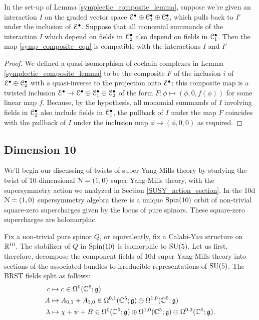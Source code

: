 \documentclass[10pt, oneside]{article}
\begin{document}
\begin{lemma} \label{interaction_pullback_lemma}
In the set-up of Lemma \ref{symplectic_composite_lemma}, suppose we're given an interaction $I$ on the graded vector space $\mathcal{E}^\bullet \oplus \mathcal{C}_1^\bullet \oplus \mathcal{C}_2^\bullet$, which pulls back to $I'$ under the inclusion of $\mathcal{E}^\bullet$.  Suppose that all monomial summands of the interaction $I$ which depend on fields in $\mathcal{C}_2^\bullet$ also depend on fields in $\mathcal{C}_1^\bullet$. Then the map \ref{symp_composite_eqn} is compatible with the interactions $I$ and $I'$
\end{lemma}

\begin{proof}
We defined a quasi-isomorphism of cochain complexes in Lemma \ref{symplectic_composite_lemma} to be the composite $F$ of the inclusion $i$ of $\mathcal{E}^\bullet \oplus \mathcal{C}_2^\bullet$ with a quasi-inverse to the projection onto $\mathcal{E}^\bullet$: this composite map is a twisted inclusion $\mathcal{E}^\bullet \to \mathcal{E}^\bullet \oplus \mathcal{C}_1^\bullet \oplus \mathcal{C}_2^\bullet$ of the form $F \colon \phi \mapsto (\phi, 0, f(\phi))$ for some linear map $f$.  Because, by the hypothesis, all monomial summands of $I$ involving fields in $\mathcal{C}_2^\bullet$ also include fields in $\mathcal{C}_1^\bullet$, the pullback of $I$ under the map $F$ coincides with the pullback of $I$ under the inclusion map $\phi \mapsto (\phi, 0, 0)$ as required.
\end{proof}


\subsection{Dimension 10}
We'll begin our discussing of twists of super Yang-Mills theory by studying the twist of 10-dimensional $\mathcal{N}=(1,0)$ super Yang-Mills theory, with the supersymmetry action we analyzed in Section \ref{SUSY_action_section}.  In the 10d $\mathcal{N}=(1,0)$ supersymmetry algebra there is a unique $\mathrm{Spin}(10)$ orbit of non-trivial square-zero supercharges given by the locus of pure spinors.  These square-zero supercharges are holomorphic.

Fix a non-trivial pure spinor $Q$, or equivalently, fix a Calabi-Yau structure on $\mathbb R^{10}$.  The stabilizer of $Q$ in $\mathrm{Spin}(10)$ is isomorphic to $\mathrm{SU}(5)$.  Let us first, therefore, decompose the component fields of 10d super Yang-Mills theory into sections of the associated bundles to irreducible representations of $\mathrm{SU}(5)$.  The BRST fields split as follows:
\begin{align*}
c &\mapsto c \in \Omega^0(\mathbb C^5; \mathfrak{g}) \\
A &\mapsto A_{0, 1} + A_{1, 0} \in \Omega^{0,1}(\mathbb C^5; \mathfrak{g}) \oplus \Omega^{1,0}(\mathbb C^5; \mathfrak{g})\\
\lambda &\mapsto \chi + \psi + B \in \Omega^0(\mathbb C^5; \mathfrak{g}) \oplus \Omega^{1,0}(\mathbb C^5; \mathfrak{g}) \oplus \Omega^{0,2}(\mathbb C^5; \mathfrak{g}). 
\end{align*}
\end{document}
